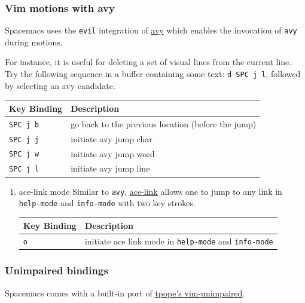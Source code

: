 \documentclass[11pt]{article}
\begin{document}
\subsubsection{Vim motions with avy}
\label{sec:org2b3dfe2}
Spacemacs uses the \texttt{evil} integration of \href{https://github.com/abo-abo/avy}{avy} which enables the
invocation of \texttt{avy} during motions.

For instance, it is useful for deleting a set of visual lines from the current line.
Try the following sequence in a buffer containing some text: \texttt{d SPC j l}, followed by
selecting an avy candidate.

\begin{center}
\begin{tabular}{ll}
Key Binding & Description\\
\hline
\texttt{SPC j b} & go back to the previous location (before the jump)\\
\texttt{SPC j j} & initiate avy jump char\\
\texttt{SPC j w} & initiate avy jump word\\
\texttt{SPC j l} & initiate avy jump line\\
\end{tabular}
\end{center}

\begin{enumerate}
\item ace-link mode
\label{sec:org4f1ffe0}
Similar to \texttt{avy}, \href{https://github.com/abo-abo/ace-link}{ace-link} allows one to jump to any link in
\texttt{help-mode} and \texttt{info-mode} with two key strokes.

\begin{center}
\begin{tabular}{ll}
Key Binding & Description\\
\hline
\texttt{o} & initiate ace link mode in \texttt{help-mode} and \texttt{info-mode}\\
\end{tabular}
\end{center}
\end{enumerate}

\subsubsection{Unimpaired bindings}
\label{sec:orgd9bdff6}
Spacemacs comes with a built-in port of \href{https://github.com/tpope/vim-unimpaired}{tpope's vim-unimpaired}.
\end{document}
